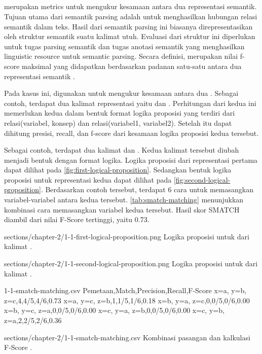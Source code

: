 \subsection{}

\SMATCH{} merupakan metrics untuk mengukur kesamaan antara dua representasi semantik.
Tujuan utama dari semantik parsing adalah untuk menghasilkan hubungan relasi semantik dalam teks.
Hasil dari semantik parsing ini biasanya direpresentasikan oleh struktur semantik suatu kalimat utuh.
Evaluasi dari struktur ini diperlukan untuk tugas parsing semantik dan tugas anotasi semantik yang menghasilkan linguistic resource untuk semantic parsing.
Secara definisi, \SMATCH{} merupakan nilai f-score maksimal yang didapatkan berdasarkan padanan satu-satu antara dua representasi semantik .

Pada kasus ini, \SMATCH{} digunakan untuk mengukur kesamaan antara dua \AMR{}.
Sebagai contoh, terdapat dua kalimat representasi \AMR{} yaitu  dan .
Perhitungan \SMATCH{} dari kedua \AMR{} ini memerlukan kedua \AMR{} dalam bentuk format logika proposisi yang terdiri dari relasi(variabel, konsep) dan relasi(variabel1, variabel2).
Setelah itu dapat dihitung presisi, recall, dan f-score dari kesamaan logika proposisi kedua \AMR{} tersebut.

Sebagai contoh, terdapat dua kalimat  dan .
Kedua kalimat tersebut diubah menjadi bentuk \AMR{} dengan format logika.
Logika proposisi dari representasi \AMR{} pertama dapat dilihat pada \cref{fig:first-logical-proposition}.
Sedangkan bentuk logika proposisi untuk representasi kedua dapat dilihat pada \cref{fig:second-logical-proposition}.
Berdasarkan contoh tersebut, terdapat 6 cara untuk memasangkan variabel-variabel antara kedua \AMR{} tersebut.
\cref{tab:smatch-matching} menunjukkan kombinasi cara memasangkan variabel kedua \AMR{} tersebut.
Hasil skor SMATCH diambil dari nilai F-Score tertinggi, yaitu 0.73.

  {sections/chapter-2/1-1-first-logical-proposition.png}
  {Logika proposisi untuk \AMR{} dari kalimat .}

  {sections/chapter-2/1-1-second-logical-proposition.png}
  {Logika proposisi untuk \AMR{} dari kalimat .}

\begin{filecontents*}{1-1-smatch-matching.csv}
Pemetaan,Match,Precision,Recall,F-Score
{x=a, y=b, z=c},4,4/5,4/6,0.73
{x=a, y=c, z=b},1,1/5,1/6,0.18
{x=b, y=a, z=c},0,0/5,0/6,0.00
{x=b, y=c, z=a},0,0/5,0/6,0.00
{x=c, y=a, z=b},0,0/5,0/6,0.00
{x=c, y=b, z=a},2,2/5,2/6,0.36
\end{filecontents*}
  {sections/chapter-2/1-1-smatch-matching.csv}
  {Kombinasi pasangan \AMR{} dan kalkulasi F-Score .}

